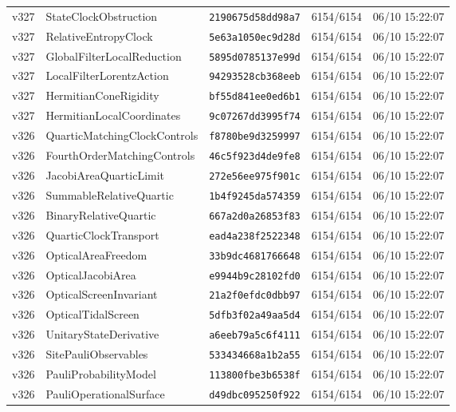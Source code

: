 \documentclass[11pt]{article}
\theoremstyle{definition}\newtheorem{deriv}{Derivation}
\begin{document}
{\begin{longtable}{@{}lllll@{}}
v327 & StateClockObstruction & \texttt{2190675d58dd98a7} & 6154/6154 & 06/10 15:22:07 \\
v327 & RelativeEntropyClock & \texttt{5e63a1050ec9d28d} & 6154/6154 & 06/10 15:22:07 \\
v327 & GlobalFilterLocalReduction & \texttt{5895d0785137e99d} & 6154/6154 & 06/10 15:22:07 \\
v327 & LocalFilterLorentzAction & \texttt{94293528cb368eeb} & 6154/6154 & 06/10 15:22:07 \\
v327 & HermitianConeRigidity & \texttt{bf55d841ee0ed6b1} & 6154/6154 & 06/10 15:22:07 \\
v327 & HermitianLocalCoordinates & \texttt{9c07267dd3995f74} & 6154/6154 & 06/10 15:22:07 \\
v326 & QuarticMatchingClockControls & \texttt{f8780be9d3259997} & 6154/6154 & 06/10 15:22:07 \\
v326 & FourthOrderMatchingControls & \texttt{46c5f923d4de9fe8} & 6154/6154 & 06/10 15:22:07 \\
v326 & JacobiAreaQuarticLimit & \texttt{272e56ee975f901c} & 6154/6154 & 06/10 15:22:07 \\
v326 & SummableRelativeQuartic & \texttt{1b4f9245da574359} & 6154/6154 & 06/10 15:22:07 \\
v326 & BinaryRelativeQuartic & \texttt{667a2d0a26853f83} & 6154/6154 & 06/10 15:22:07 \\
v326 & QuarticClockTransport & \texttt{ead4a238f2522348} & 6154/6154 & 06/10 15:22:07 \\
v326 & OpticalAreaFreedom & \texttt{33b9dc4681766648} & 6154/6154 & 06/10 15:22:07 \\
v326 & OpticalJacobiArea & \texttt{e9944b9c28102fd0} & 6154/6154 & 06/10 15:22:07 \\
v326 & OpticalScreenInvariant & \texttt{21a2f0efdc0dbb97} & 6154/6154 & 06/10 15:22:07 \\
v326 & OpticalTidalScreen & \texttt{5dfb3f02a49aa5d4} & 6154/6154 & 06/10 15:22:07 \\
v326 & UnitaryStateDerivative & \texttt{a6eeb79a5c6f4111} & 6154/6154 & 06/10 15:22:07 \\
v326 & SitePauliObservables & \texttt{533434668a1b2a55} & 6154/6154 & 06/10 15:22:07 \\
v326 & PauliProbabilityModel & \texttt{113800fbe3b6538f} & 6154/6154 & 06/10 15:22:07 \\
v326 & PauliOperationalSurface & \texttt{d49dbc095250f922} & 6154/6154 & 06/10 15:22:07 \\

\end{longtable}}
\end{document}
